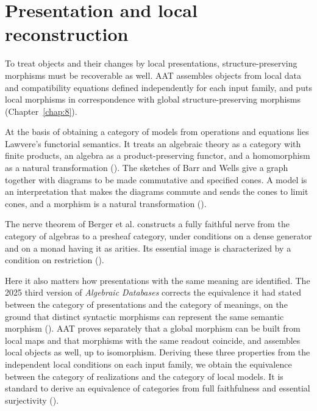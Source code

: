 \section{Presentation and local reconstruction}\label{sec:R.6}

To treat objects and their changes by local presentations, structure-preserving morphisms
must be recoverable as well.
AAT assembles objects from local data and compatibility equations defined independently for
each input family, and puts local morphisms in correspondence with global
structure-preserving morphisms (Chapter~\ref{chap:8}).

At the basis of obtaining a category of models from operations and equations lies Lawvere's
functorial semantics. It treats an algebraic theory as a category with finite products, an
algebra as a product-preserving functor, and a homomorphism as a natural transformation
(\cite[\href{https://www.sas.rochester.edu/mth/sites/doug-ravenel/otherpapers/lawvere.pdf}{pp. 869--870}]{Lawvere63}).
The sketches of Barr and Wells give a graph together with diagrams to be made commutative
and specified cones. A model is an interpretation that makes the diagrams commute and sends
the cones to limit cones, and a morphism is a natural transformation
(\cite[\href{https://tac.mta.ca/tac/reprints/articles/12/tr12.pdf}{Chapter 4, \S1.2}]{BW85}).

The nerve theorem of Berger et al. constructs a fully faithful nerve from the category of
algebras to a presheaf category, under conditions on a dense generator and on a monad having
it as arities. Its essential image is characterized by a condition on restriction
(\cite[\href{https://math.univ-cotedazur.fr/~cberger/arities.pdf}{Theorem 1.10}]{BMW12}).

Here it also matters how presentations with the same meaning are identified.
The 2025 third version of \emph{Algebraic Databases} corrects the equivalence it had stated
between the category of presentations and the category of meanings, on the ground that
distinct syntactic morphisms can represent the same semantic morphism
(\cite[\href{https://arxiv.org/pdf/1602.03501v3}{Appendix B.1--B.3}]{SSVW17}).
AAT proves separately that a global morphism can be built from local maps and that morphisms
with the same readout coincide, and assembles local objects as well, up to isomorphism.
Deriving these three properties from the independent local conditions on each input family,
we obtain the equivalence between the category of realizations and the category of local
models. It is standard to derive an equivalence of categories from full faithfulness and
essential surjectivity
(\cite[\href{https://stacks.math.columbia.edu/tag/02C3}{Tag 02C3, Lemma 4.2.19}]{Stacks}).

